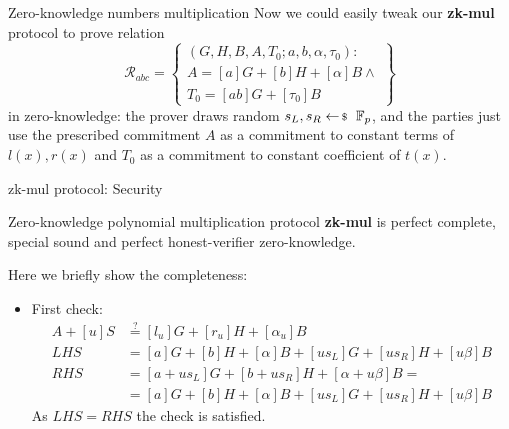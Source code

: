 \documentclass{zkdl-presentation-template}
\begin{document}
    \begin{frame}{Zero-knowledge numbers multiplication}
        Now we could easily tweak our \textbf{zk-mul} protocol to prove relation
        $$
        \mathcal{R}_{abc} = \left\{\begin{array}{l}
            (G,H,B,A,T_0; a,b, \alpha, \tau_0) : \\
            A = [a]G + [b]H + [\alpha]B \wedge \\
            T_0 = [ab]G + [\tau_0]B
        \end{array}\right\}
        $$
        in zero-knowledge: \pause the prover draws random $s_L, s_R \leftarrowS \mathbb{F}_p$, and the parties just use the prescribed commitment $A$ as a commitment to constant terms of $l(x), r(x)$ and $T_0$ as a commitment to constant coefficient of $t(x)$.
    \end{frame}

    \begin{frame}{zk-mul protocol: Security}
        \begin{theorem}
            Zero-knowledge polynomial multiplication protocol \textbf{zk-mul} is perfect complete, special sound and perfect honest-verifier zero-knowledge.
        \end{theorem}
        \pause
        Here we briefly show the completeness:
        \begin{itemize}
            \item First check: \begin{align*}
                A + [u]S &\stackrel{?}{=} [l_u]G + [r_u]H + [\alpha_u]B \\
                LHS &= [a]G + [b]H + [\alpha]B + [us_L]G + [us_R]H + [u\beta]B \\
                RHS &= [a+ u s_L]G + [b + u s_R]H + [\alpha + u \beta]B = \\
                &=[a]G + [b]H + [\alpha]B + [us_L]G + [us_R]H + [u\beta]B
            \end{align*}
            As $LHS = RHS$ the check is satisfied.
        \end{itemize}
    \end{frame}
\end{document}
